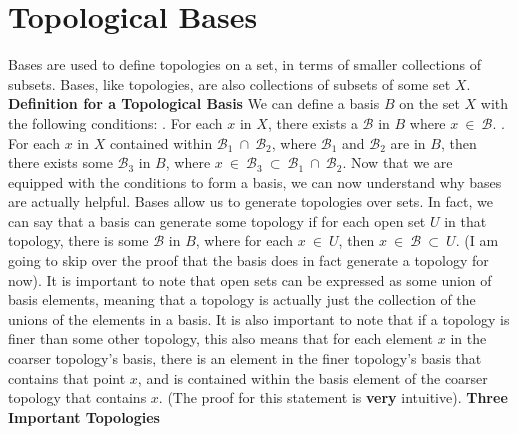 \documentclass{article}
\begin{document}
\section{Topological Bases}
Bases are used to define topologies on a set, in terms of smaller collections of subsets. Bases, like topologies, are also collections of subsets of some set $X$.
\newline\newline
\textbf{Definition for a Topological Basis}
\newline\newline
We can define a basis $B$ on the set $X$ with the following conditions:
\newline{}. For each $x$ in $X$, there exists a $\mathcal{B}$ in $B$ where $x \ \in \ \mathcal{B}$.
\newline{}. For each $x$ in $X$ contained within $\mathcal{B}_1 \ \cap \ \mathcal{B}_2$, where $\mathcal{B}_1$ and $\mathcal{B}_2$ are in $B$, then there exists some $\mathcal{B}_3$ in $B$, where $x \ \in \ \mathcal{B}_3 \ \subset \ \mathcal{B}_1 \ \cap \ \mathcal{B}_2$.
\newline\newline
Now that we are equipped with the conditions to form a basis, we can now understand why bases are actually helpful. Bases allow us to generate topologies over sets. In fact, we can say that a basis can generate some topology if for each open set $U$ in that topology, there is some $\mathcal{B}$ in $B$, where for each $x \ \in \ U$, then $x \ \in \ \mathcal{B} \ \subset \ U$. (I am going to skip over the proof that the basis does in fact generate a topology for now).
\newline\newline
It is important to note that open sets can be expressed as some union of basis elements, meaning that a topology is actually just the collection of the unions of the elements in a basis. It is also important to note that if a topology is finer than some other topology, this also means that for each element $x$ in the coarser topology's basis, there is an element in the finer topology's basis that contains that point $x$, and is contained within the basis element of the coarser topology that contains $x$. (The proof for this statement is \textbf{very} intuitive).
\newline\newline
\textbf{Three Important Topologies}
\newline\newline
\end{document}
